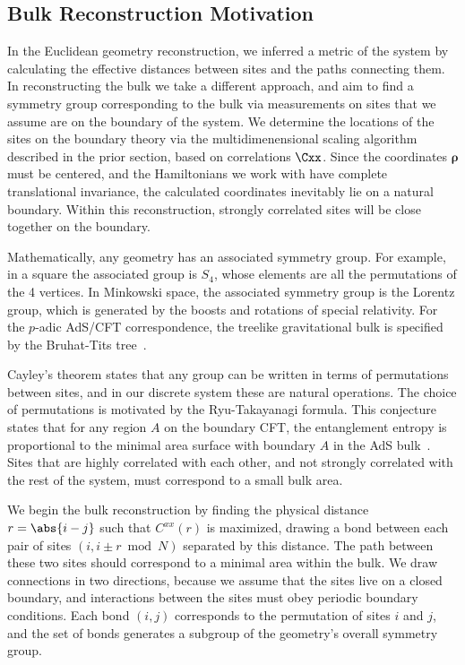 \begin{bibunit}
\subsection{Bulk Reconstruction Motivation}
In the Euclidean geometry reconstruction, we inferred a metric of the system by calculating the effective distances between sites and the paths connecting them.  In reconstructing the bulk we take a different approach, and aim to find a symmetry group corresponding to the bulk via measurements on sites that we assume are on the boundary of the system. We determine the locations of the sites on the boundary theory via the multidimenensional scaling algorithm described in the prior section, based on correlations $\Cxx$.  Since the coordinates $\boldsymbol{\rho}$ must be centered, and the Hamiltonians we work with have complete translational invariance, the calculated coordinates inevitably lie on a natural boundary. Within this reconstruction, strongly correlated sites will be close together on the boundary.

Mathematically, any geometry has an associated symmetry group.  For example, in a square the associated group is $S_4$, whose elements are all the permutations of the 4 vertices.  In Minkowski space, the associated symmetry group is the Lorentz group, which is generated by the boosts and rotations of special relativity.  For the $p$-adic AdS/CFT correspondence, the treelike gravitational bulk is specified by the Bruhat-Tits tree~\cite{heydeman2016tensor, gubser2017p}.

Cayley's theorem states that any group can be written in terms of permutations between sites, and in our discrete system these are natural operations.  The choice of permutations is motivated by the Ryu-Takayanagi formula. This conjecture states that for any region $A$ on the boundary CFT, the entanglement entropy is proportional to the minimal area surface with boundary $A$ in the AdS bulk~\cite{ryu2006holographic}.  Sites that are highly correlated with each other, and not strongly correlated with the rest of the system, must correspond to a small bulk area.  

We begin the bulk reconstruction by finding the physical distance $r=\abs{i-j}$ such that $C^{xx}(r)$ is maximized, drawing a bond between each pair of sites $(i, i\pm r\bmod N)$ separated by this distance.  The path between these two sites should correspond to a minimal area within the bulk.  We draw connections in two directions, because we assume that the sites live on a closed boundary, and interactions between the sites must obey periodic boundary conditions.  Each bond $(i, j)$ corresponds to the permutation of sites $i$ and $j$, and the set of bonds generates a subgroup of the geometry's overall symmetry group.


\end{bibunit}
